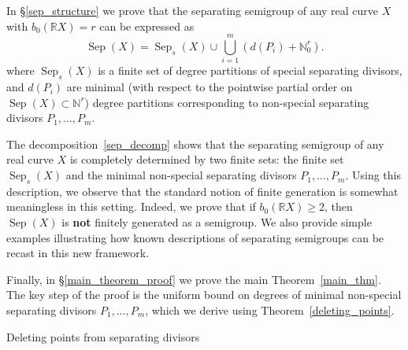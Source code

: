 \documentclass[x11names,oneside,11pt]{amsart}
\makeatletter
\theoremstyle{definition}
\theoremstyle{remark}
\DeclareMathOperator{\Sep}{Sep}
\newcommand{\N}{\mathbb{N}}
\newcommand{\R}{\mathbb{R}}
\renewcommand{\section}{%
  \@startsection{section}{1}%
    \z@{.7\linespacing\@plus\linespacing}{.5\linespacing}%
    {\normalfont\bfseries\centering}%
}
\makeatother
\begin{document}
  \medskip 

  In \S\ref{sep_structure} we prove that the separating semigroup of any real curve $X$ with $b_0(\R X) = r$ can be expressed as
     \begin{equation}\tag{$\diamondsuit$}
          \Sep(X) = \Sep_s(X) \cup \bigcup_{i=1}^{m} (d(P_i) + \N_0^{r}).  \label{sep_decomp} 
      \end{equation}
  where $\Sep_s(X)$ is a finite set of degree partitions of special separating divisors, and $d(P_i)$ are minimal (with respect to the pointwise partial order on $\Sep(X) \subset \N^r$) degree partitions corresponding to non-special separating divisors $P_1, \ldots, P_m$.   

  The decomposition~\eqref{sep_decomp} shows that the separating semigroup of any real curve  $X$ is completely determined by two finite sets: the finite set $\Sep_s(X)$ and the minimal non-special separating divisors $P_1,\ldots, P_m$. Using this description, we observe that the standard notion of finite generation is somewhat meaningless in this setting. Indeed, we prove that if $b_0(\R X) \geqslant 2$, then $\Sep(X)$ is {\bf not} finitely generated as a semigroup. We also provide simple examples illustrating how known descriptions of separating semigroups can be recast in this new framework.

  Finally, in \S\ref{main_theorem_proof} we prove the main Theorem~\ref{main_thm}. The key step of the proof is the uniform bound on degrees of minimal non-special separating divisors $P_1, \ldots, P_m$, which we derive using Theorem~\ref{deleting_points}.
  

  \section{Deleting points from separating divisors}\label{Deleting_section}
\end{document}
